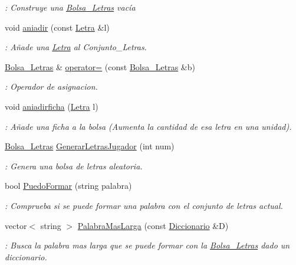 \begin{DoxyCompactItemize}
\begin{DoxyCompactList}\small\item\em \+: Construye una \hyperlink{classBolsa__Letras}{Bolsa\+\_\+\+Letras} vacía \end{DoxyCompactList}\item 
void \hyperlink{classBolsa__Letras_aec590e0eddf7ab585a15cda9369de21c}{aniadir} (const \hyperlink{classLetra}{Letra} \&l)
\begin{DoxyCompactList}\small\item\em \+: Añade una \hyperlink{classLetra}{Letra} al Conjunto\+\_\+\+Letras. \end{DoxyCompactList}\item 
\hyperlink{classBolsa__Letras}{Bolsa\+\_\+\+Letras} \& \hyperlink{classBolsa__Letras_a2c283861ab50b212023715c3959ec053}{operator=} (const \hyperlink{classBolsa__Letras}{Bolsa\+\_\+\+Letras} \&b)
\begin{DoxyCompactList}\small\item\em \+: Operador de asignacion. \end{DoxyCompactList}\item 
void \hyperlink{classBolsa__Letras_ab058f1081bea740d77c9f9398ebd61e7}{aniadirficha} (\hyperlink{classLetra}{Letra} l)
\begin{DoxyCompactList}\small\item\em \+: Añade una ficha a la bolsa (Aumenta la cantidad de esa letra en una unidad). \end{DoxyCompactList}\item 
\hyperlink{classBolsa__Letras}{Bolsa\+\_\+\+Letras} \hyperlink{classBolsa__Letras_a9f1e76257206146e695227576abed336}{Generar\+Letras\+Jugador} (int num)
\begin{DoxyCompactList}\small\item\em \+: Genera una bolsa de letras aleatoria. \end{DoxyCompactList}\item 
bool \hyperlink{classBolsa__Letras_a6a611cf986750285ec11da71275199e2}{Puedo\+Formar} (string palabra)
\begin{DoxyCompactList}\small\item\em \+: Comprueba si se puede formar una palabra con el conjunto de letras actual. \end{DoxyCompactList}\item 
vector$<$ string $>$ \hyperlink{classBolsa__Letras_afdbea74730c798b860d76655f05082c8}{Palabra\+Mas\+Larga} (const \hyperlink{classDiccionario}{Diccionario} \&D)
\begin{DoxyCompactList}\small\item\em \+: Busca la palabra mas larga que se puede formar con la \hyperlink{classBolsa__Letras}{Bolsa\+\_\+\+Letras} dado un diccionario. \end{DoxyCompactList}\item 

\end{DoxyCompactItemize}
